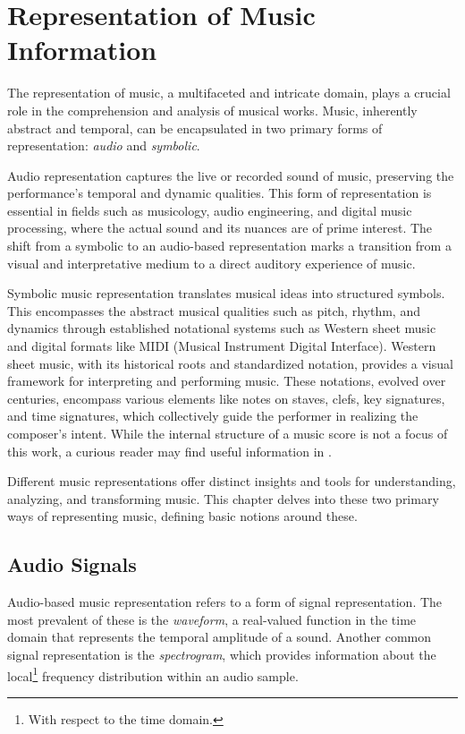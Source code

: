 \chapter{Representation of Music Information}

The representation of music, a multifaceted and intricate domain, plays a crucial role in the comprehension and analysis of musical works. Music, inherently abstract and temporal, can be encapsulated in two primary forms of representation: \emph{audio} and \emph{symbolic}.

Audio representation captures the live or recorded sound of music, preserving the performance's temporal and dynamic qualities. This form of representation is essential in fields such as musicology, audio engineering, and digital music processing, where the actual sound and its nuances are of prime interest. The shift from a symbolic to an audio-based representation marks a transition from a visual and interpretative medium to a direct auditory experience of music.

Symbolic music representation translates musical ideas into structured symbols. This encompasses the abstract musical qualities such as pitch, rhythm, and dynamics through established notational systems such as Western sheet music and digital formats like MIDI (Musical Instrument Digital Interface). Western sheet music, with its historical roots and standardized notation, provides a visual framework for interpreting and performing music. These notations, evolved over centuries, encompass various elements like notes on staves, clefs, key signatures, and time signatures, which collectively guide the performer in realizing the composer's intent. While the internal structure of a music score is not a focus of this work, a curious reader may find useful information in \cite{Read1969}.

Different music representations offer distinct insights and tools for understanding, analyzing, and transforming music. This chapter delves into these two primary ways of representing music, defining basic notions around these.

\section{Audio Signals}

Audio-based music representation refers to a form of signal representation. The most prevalent of these is the \emph{waveform}, a real-valued function in the time domain that represents the temporal amplitude of a sound. Another common signal representation is the \emph{spectrogram}, which provides information about the local\footnote{With respect to the time domain.} frequency distribution within an audio sample.

